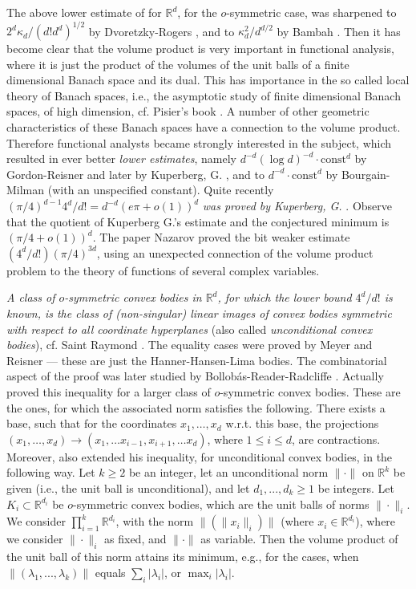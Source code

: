 \documentclass[12pt]{article}
\newcommand{\R}{\mathbb{R}}
\begin{document}
The above lower estimate of \cite{Mah39} for
${\mathbb R}^d$, for the $o$-symmetric case,
was sharpened to $2^d \kappa _d /(d!d^d)^{1/2}$ by Dvoretzky-Rogers 
\cite{DR}, and to 
$\kappa _d^2/d^{d/2}$ by Bambah \cite{Bam}. Then it has become clear that the
volume product is very important in functional analysis, where it is just the
product of the volumes of the unit balls of a finite dimensional Banach space
and its dual. This has importance in the so called local theory of Banach
spaces, i.e., the asymptotic 
study of finite dimensional Banach spaces, of high dimension, cf. Pisier's
book \cite{Pi}. A number of
other geometric characteristics of these Banach spaces have a 
connection to the
volume product. Therefore functional analysts became strongly interested in
the subject, which resulted in ever better {\it{lower estimates}}, namely  
$d^{-d} (\log d)^{-d} \cdot {\text{const}}^d 
$ by Gordon-Reisner \cite{GR} and later by Kuperberg, G. \cite{K92},
and to $d^{-d} \cdot {\text{const}} ^d  $ 
by Bourgain-Milman \cite{BoMi}
(with an unspecified constant). Quite recently
$(\pi /4)^{d-1} 4^d/d!
=d^{-d}\left( e \pi +o(1) \right) ^d$ {\it{was proved 
by Kuperberg, G.}} \cite{K08}. Observe that the quotient of
Kuperberg G.'s estimate and the
conjectured minimum is $(\pi / 4 + o(1))^d$. The paper Nazarov \cite{N} 
proved the bit weaker estimate $(4^d/d!)( \pi /4)^{3d}$, using an unexpected
connection of the volume product problem to the theory of functions of
several complex variables.

{\it{A class of $o$-symmetric convex bodies in ${\mathbb R}^d$, 
for which the lower bound $4^d/d!$ is
known, is the class of (non-singular) linear images of convex bodies
symmetric with respect
to all coordinate hyperplanes}} (also called {\it{unconditional convex 
bodies}}), 
cf. Saint Raymond \cite{SR}.
The equality cases were proved
by Meyer \cite{Me86} and Reisner \cite{R87} --- these are just the
Hanner-Hansen-Lima bodies. The combinatorial aspect of the proof was later
studied by Bollob\'as-Reader-Radcliffe \cite{BLR}. 
Actually \cite{SR} proved this inequality for a larger
class of $o$-symmetric convex bodies. These are the ones,
for which the associated norm satisfies the following. There exists a
base, such that for the coordinates $x_1, \ldots ,x_d$ w.r.t. this base,
the projections $(x_1, \ldots ,x_d) \to (x_1, \ldots x_{i-1},x_{i+1}, \ldots
x_d)$, where $1 \le i \le d$, are contractions. 
Moreover, \cite{SR} also extended his inequality, for unconditional convex
bodies, in the following way. Let $k \ge 2$ be an integer, let
an unconditional norm $\| \cdot \| $
on ${\mathbb R}^k$ be given (i.e., the unit ball is unconditional), and let
$d_1,...,d_k \ge 1$ be integers. Let
$K_i \subset {\mathbb R}^{d_i}$ be $o$-symmetric convex bodies, which are the
unit balls of norms $\| \cdot \| _i$. We consider $\prod _{i=1}^k {\mathbb R}
^{d_i}$, with the norm $\| ( \| x_i \| _i ) \| $ (where $x_i \in {\R}^{d_i}$), 
where we consider $\| \cdot
\| _i $ as fixed, and $\| \cdot \| $ as variable. Then the volume product of
the unit ball of this norm attains its minimum, e.g., for the cases, when 
$\| ( \lambda _1, ..., \lambda _k) \| $ 
equals $\sum _i |\lambda _i|$, or $\max _i |\lambda _i|$.
\end{document}
